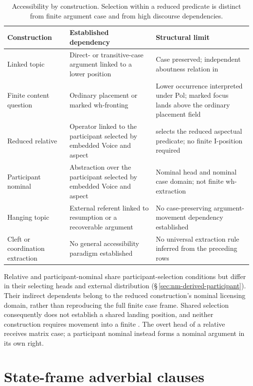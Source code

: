 \begin{table}[htbp]
\footnotesize
\caption{Accessibility by construction. Selection within a reduced predicate
 is distinct from finite argument case and from high discourse dependencies.}
\label{tab:construction-accessibility}
\begin{tabularx}{\textwidth}{L L L}
\toprule
Construction & Established dependency & Structural limit \\
\midrule
Linked topic & Direct- or transitive-case argument linked to a lower position &
Case preserved; independent aboutness relation in  \\
Finite content question & Ordinary placement or marked wh-fronting &
Lower occurrence interpreted under Pol; marked focus lands above the ordinary
placement field \\
Reduced  relative & Operator linked to the participant selected by
embedded Voice and aspect &  selects the reduced aspectual
predicate; no finite I-position required \\
Participant nominal  & Abstraction over the participant selected by
embedded Voice and aspect & Nominal head and nominal case domain;
not finite wh-extraction \\
Hanging topic & External referent linked to resumption or a recoverable argument &
No case-preserving argument-movement dependency established \\
Cleft or coordination extraction & No general accessibility paradigm established &
No universal extraction rule inferred from the preceding rows \\
\bottomrule
\end{tabularx}
\end{table}

\noindent Relative  and participant-nominal  share
 participant-selection conditions but differ in their selecting heads and
 external distribution (§\,\ref{sec:nm-derived-participant}). Their
 indirect dependents belong to the reduced construction's nominal licensing
 domain, rather than reproducing the full finite case frame. Shared selection
 consequently does not establish a shared landing position, and neither
 construction requires movement into a finite . The overt head
 of a relative receives matrix case; a participant nominal instead forms a
 nominal argument in its own right.

\section{State-frame adverbial clauses}
\label{sec:state-frame}

